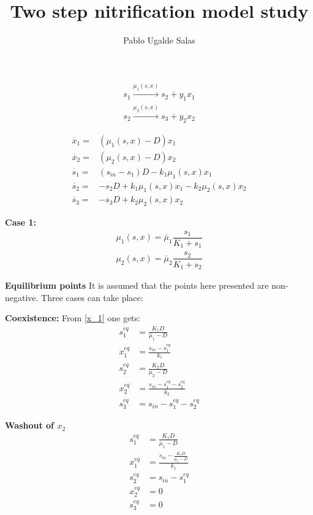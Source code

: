 \documentclass[]{report}
\title{Two step nitrification model study}
\author{Pablo Ugalde Salas}
\begin{document}
\maketitle


\begin{align}
\label{Reaction1} \tag{R G1} 	s_1 \stackrel{\mu_1(s,x)}{\longrightarrow} s_2 + y_1x_1  \\
\label{Reaction2} \tag{R G2} s_2\stackrel{\mu_2(s,x)}{\longrightarrow} s_3 + y_2x_2 
\end{align}

\begin{align} 
\dot{x_1} =& \left(\mu_1(s,x) -D \right)x_1  \label{x_1} \\
\dot{x_2} =& \left(\mu_2(s,x) -D \right)x_2  \label{x_2}\\
\dot{s_1} =& \displaystyle (s_{in}-s_1)D- k_1\mu_1(s,x) x_1  \\
\dot{s_2} = & \displaystyle -s_2D+ k_1\mu_1(s,x)x_1 -k_2\mu_2(s,x) x_2  \\
\dot{s_3} =&  \displaystyle -s_3D+ k_2\mu_2(s,x) x_2 
\end{align}	

\textbf{Case 1:}
\begin{align}
\mu_1(s,x) =  \bar{\mu}_1 \dfrac{s_1}{K_1 + s_1} \\
\mu_2(s,x) =  \bar{\mu}_2 \dfrac{s_2}{K_1 + s_2} 
\end{align}

\textbf{Equilibrium points}
It is assumed that the points here presented are non-negative.  Three cases can take place:

\textbf{Coexistence:}
From \eqref{x_1} one gets:
\begin{align}
s_1^{eq} &= \frac{K_1D}{\bar{\mu}_1 - D} \\
x_1^{eq} &= \frac{s_{in} - s_1^{eq}}{k_1} \\
s_2^{eq} &= \frac{K_2D}{\bar{\mu}_2 - D} \\
x_2^{eq} &=\frac{s_{in} - s_1^{eq}-s_2^{eq}}{k_2}\\
s_3^{eq} &= s_{in} - s_1^{eq}-s_2^{eq} 
\end{align}

\textbf{Washout of $x_2$}
\begin{align}
s_1^{eq} &= \frac{K_1D}{\bar{\mu}_1 - D} \\
x_1^{eq} &= \frac{s_{in} - \frac{K_1D}{\bar{\mu}_1 - D}}{k_1} \\
s_2^{eq} &= s_{in} - s_1^{eq} \\
x_2^{eq} &=0 \\
s_3^{eq} &= 0 
\end{align}
\end{document}
